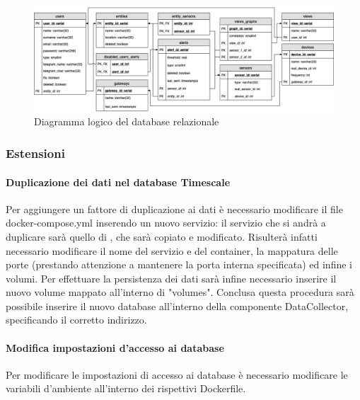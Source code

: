 			\begin{landscape}
			\begin{figure}[H]
				\centering
				\includegraphics[scale=0.600]{res/images/DATABASE/ER_Modificato.png}
				\caption{Diagramma logico del database relazionale}
				\label{Diagramma 9}
			\end{figure}
			\end{landscape}
	\subsubsection{Estensioni}
		\paragraph{Duplicazione dei dati nel database Timescale}
			Per aggiungere un fattore di duplicazione ai dati è necessario modificare il file docker-compose.yml inserendo un nuovo servizio: il servizio che si andrà a duplicare sarà quello di , che sarà copiato e modificato.
			\newline
			Risulterà infatti necessario modificare il nome del servizio e del container, la mappatura delle porte (prestando attenzione a mantenere la porta interna specificata) ed infine i volumi.
			\newline
			Per effettuare la persistenza dei dati sarà infine necessario inserire il nuovo volume mappato all'interno di "volumes".
			Conclusa questa procedura sarà possibile inserire il nuovo database all'interno della componente DataCollector, specificando il corretto indirizzo.

		\paragraph{Modifica impostazioni d'accesso ai database}	
			Per modificare le impostazioni di accesso ai database è necessario modificare le variabili d'ambiente all'interno dei rispettivi Dockerfile.		